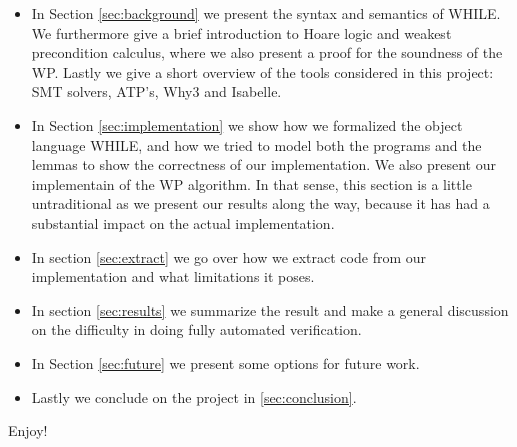 \begin{itemize}
  \item In Section \ref{sec:background} we present the syntax and semantics of WHILE.
        We furthermore give a brief introduction to Hoare logic and weakest precondition calculus, where we also present a proof for the soundness of the WP.
        Lastly we give a short overview of the tools considered in this project: SMT solvers, ATP's, Why3 and Isabelle.
  \item In Section \ref{sec:implementation} we show how we formalized the object language WHILE, and how we tried to model both the programs and the lemmas to show the correctness of our implementation. We also present our implementain of the WP algorithm.
        In that sense, this section is a little untraditional as we present our results along the way, because it has had a substantial impact on the actual implementation.
  \item In section \ref{sec:extract} we go over how we extract code from our implementation and what limitations it poses.
  \item In section \ref{sec:results} we summarize the result and make a general discussion on the difficulty in doing fully automated verification.
  \item In Section \ref{sec:future} we present some options for future work.
  \item Lastly we conclude on the project in \ref{sec:conclusion}.
\end{itemize}

Enjoy!
